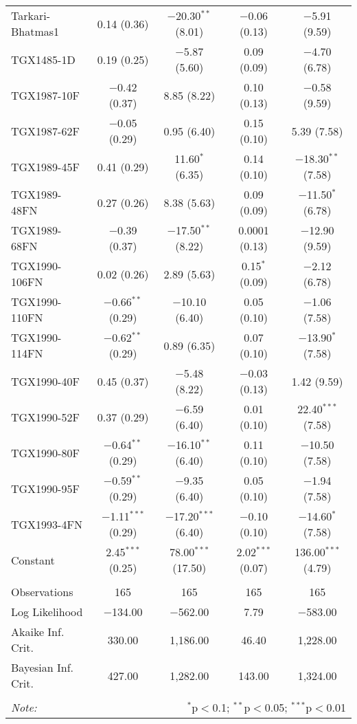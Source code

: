 \documentclass[
]{article}
\begin{document}
\begin{longtable}{@{\extracolsep{-10pt}}lcccc}
  Tarkari-Bhatmas1 & 0.14 (0.36) & $-$20.30$^{**}$ (8.01) & $-$0.06 (0.13) & $-$5.91 (9.59) \\ 
  TGX1485-1D & 0.19 (0.25) & $-$5.87 (5.60) & 0.09 (0.09) & $-$4.70 (6.78) \\ 
  TGX1987-10F & $-$0.42 (0.37) & 8.85 (8.22) & 0.10 (0.13) & $-$0.58 (9.59) \\ 
  TGX1987-62F & $-$0.05 (0.29) & 0.95 (6.40) & 0.15 (0.10) & 5.39 (7.58) \\ 
  TGX1989-45F & 0.41 (0.29) & 11.60$^{*}$ (6.35) & 0.14 (0.10) & $-$18.30$^{**}$ (7.58) \\ 
  TGX1989-48FN & 0.27 (0.26) & 8.38 (5.63) & 0.09 (0.09) & $-$11.50$^{*}$ (6.78) \\ 
  TGX1989-68FN & $-$0.39 (0.37) & $-$17.50$^{**}$ (8.22) & 0.0001 (0.13) & $-$12.90 (9.59) \\ 
  TGX1990-106FN & 0.02 (0.26) & 2.89 (5.63) & 0.15$^{*}$ (0.09) & $-$2.12 (6.78) \\ 
  TGX1990-110FN & $-$0.66$^{**}$ (0.29) & $-$10.10 (6.40) & 0.05 (0.10) & $-$1.06 (7.58) \\ 
  TGX1990-114FN & $-$0.62$^{**}$ (0.29) & 0.89 (6.35) & 0.07 (0.10) & $-$13.90$^{*}$ (7.58) \\ 
  TGX1990-40F & 0.45 (0.37) & $-$5.48 (8.22) & $-$0.03 (0.13) & 1.42 (9.59) \\ 
  TGX1990-52F & 0.37 (0.29) & $-$6.59 (6.40) & 0.01 (0.10) & 22.40$^{***}$ (7.58) \\ 
  TGX1990-80F & $-$0.64$^{**}$ (0.29) & $-$16.10$^{**}$ (6.40) & 0.11 (0.10) & $-$10.50 (7.58) \\ 
  TGX1990-95F & $-$0.59$^{**}$ (0.29) & $-$9.35 (6.40) & 0.05 (0.10) & $-$1.94 (7.58) \\ 
  TGX1993-4FN & $-$1.11$^{***}$ (0.29) & $-$17.20$^{***}$ (6.40) & $-$0.10 (0.10) & $-$14.60$^{*}$ (7.58) \\ 
  Constant & 2.45$^{***}$ (0.25) & 78.00$^{***}$ (17.50) & 2.02$^{***}$ (0.07) & 136.00$^{***}$ (4.79) \\ 
 \hline \\[-1.8ex] 
Observations & 165 & 165 & 165 & 165 \\ 
Log Likelihood & $-$134.00 & $-$562.00 & 7.79 & $-$583.00 \\ 
Akaike Inf. Crit. & 330.00 & 1,186.00 & 46.40 & 1,228.00 \\ 
Bayesian Inf. Crit. & 427.00 & 1,282.00 & 143.00 & 1,324.00 \\ 
\hline 
\hline \\[-1.8ex] 
\textit{Note:}  & \multicolumn{4}{r}{$^{*}$p$<$0.1; $^{**}$p$<$0.05; $^{***}$p$<$0.01} \\ 
\end{longtable} 
\endgroup
\end{document}
